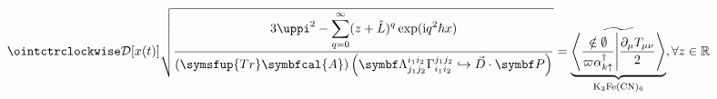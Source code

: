 \documentclass{standalone}
\begin{document}
\Huge
$\displaystyle \ointctrclockwise\mathcal{D}[x(t)]\sqrt{\frac{\displaystyle3\uppi^2-\sum_{q=0}^{\infty}(z+\hat L)^{q}\exp(\mathrm{i}q^2 \hbar x)}{\displaystyle (\symsfup{Tr}\symbfcal{A})\left(\symbf\Lambda_{j_1j_2}^{i_1i_2}\Gamma_{i_1i_2}^{j_1j_2}\hookrightarrow\vec D\cdot \symbf P  \right)}}
=\underbrace{\widetilde{\left\langle \frac{\notin \emptyset}{\varpi\alpha_{k\uparrow}^\dagger}\middle\vert \frac{\partial_\mu T_{\mu\nu}}{2}\right\rangle}}_{\mathrm{K}_3\mathrm{Fe}(\mathrm{CN})_6} ,\forall z \in \mathbb{R}$
\end{document}
